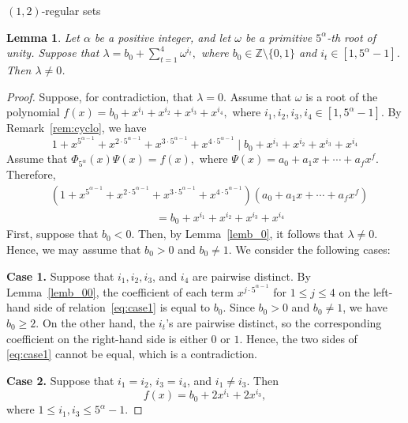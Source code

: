 \documentclass[12pt]{article}
\makeatletter
\renewcommand{\subsection}{\@startsection{subsection}{2}{0mm}{7mm}{4mm}
{\bf\large}}
\newtheorem{lemA}[propA]{Lemma}
\makeatother
\begin{document}
   \subsection{$(1,2)$-regular sets}
   \begin{lemA}\label{lemb_5}
   	Let $\alpha$ be a positive integer, and let $\omega$ be a primitive $5^\alpha$-th root of unity. Suppose that
   	$
   	\lambda = b_0 + \sum_{t=1}^{4} \omega^{i_t},
   	$
   	where $b_0 \in \mathbb{Z} \setminus \{0, 1\}$ and $i_t \in [1,5^{\alpha}-1]$. Then $\lambda \neq 0$.
   \end{lemA}
   \begin{proof}
   	Suppose, for contradiction, that $\lambda = 0$. Assume that $\omega$ is a root of the polynomial
   	$
   	f(x)=b_0+x^{i_1}+x^{i_2}+x^{i_3}+x^{i_4},
   	$
   	where $i_1,i_2,i_3,i_4\in[1,5^\alpha-1]$. By Remark~\ref{rem:cyclo}, we have
   	\[
   	1+x^{5^{\alpha-1}}+x^{2\cdot5^{\alpha-1}}+x^{3\cdot5^{\alpha-1}}+x^{4\cdot5^{\alpha-1}}
   	\mid
   	b_0+x^{i_1}+x^{i_2}+x^{i_3}+x^{i_4}
   	\]
   	Assume that
   	$
   \Phi_{5^\alpha}(x)\Psi(x)	=f(x),
   	$
   	where
   	$
   	\Psi(x)=a_0+a_1x+\cdots+a_fx^f.
   	$
   	Therefore,
   	\begin{equation}\label{eq:case1}
   		\begin{aligned}
   			&\left(1+x^{5^{\alpha-1}}+x^{2\cdot5^{\alpha-1}}+x^{3\cdot5^{\alpha-1}}+x^{4\cdot5^{\alpha-1}}\right)
   			\left(a_0+a_1x+\cdots+a_fx^f\right)\\
   			&\hspace{4cm}=b_0+x^{i_1}+x^{i_2}+x^{i_3}+x^{i_4}
   		\end{aligned}
   	\end{equation}
   	First, suppose that $b_0<0$. Then, by Lemma~\ref{lemb_0}, it follows that $\lambda\neq0$. Hence, we may assume that $b_0>0$ and $b_0\neq1$. We consider the following cases:
   	
   	\textbf{Case 1.}
   	Suppose that $i_1,i_2,i_3$, and $i_4$ are pairwise distinct. By Lemma~\ref{lemb_00}, the coefficient of each term $x^{j\cdot5^{\alpha-1}}$ for $1\leq j\leq4$ on the left-hand side of relation~\eqref{eq:case1} is equal to $b_0$. Since $b_0>0$ and $b_0\neq1$, we have $b_0\geq2$. On the other hand, the $i_t$'s are pairwise distinct, so the corresponding coefficient on the right-hand side is either $0$ or $1$. Hence, the two sides of \eqref{eq:case1} cannot be equal, which is a contradiction.
   	
   	   	\medskip
   	   	
   	\textbf{Case 2.}
   	Suppose that $i_1=i_2$, $i_3=i_4$, and $i_1\neq i_3$. Then
   	\[
   	f(x)=b_0+2x^{i_1}+2x^{i_3},
   	\]
   	where $1\le i_1,i_3\le 5^\alpha-1$.
   	

\end{proof}
\end{document}
